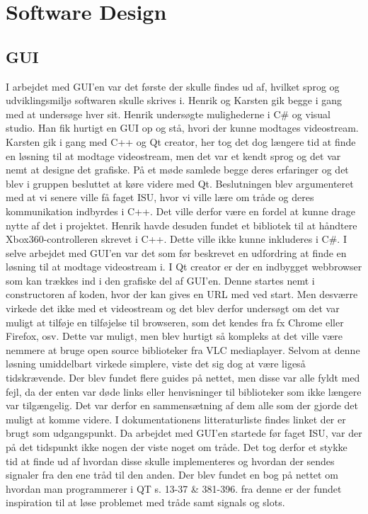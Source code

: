 \section{Software Design} \label{ch:SWdesign}


\subsection{GUI}
I arbejdet med GUI’en var det første der skulle findes ud af, hvilket sprog og udviklingsmiljø softwaren skulle skrives i. Henrik og Karsten gik begge i gang med at undersøge hver sit. Henrik undersøgte mulighederne i C\# og visual studio. Han fik hurtigt en GUI op og stå, hvori der kunne modtages videostream. Karsten gik i gang med C++ og Qt creator, her tog det dog længere tid at finde en løsning til at modtage videostream, men det var et kendt sprog og det var nemt at designe det grafiske. På et møde samlede begge deres erfaringer og det blev i gruppen besluttet at køre videre med Qt. Beslutningen blev argumenteret med at vi senere ville få faget ISU, hvor vi ville lære om tråde og deres kommunikation indbyrdes i C++. Det ville derfor være en fordel at kunne drage nytte af det i projektet. Henrik havde desuden fundet et bibliotek til at håndtere Xbox360-controlleren skrevet i C++. Dette ville ikke kunne inkluderes i C\#.
I selve arbejdet med GUI’en var det som før beskrevet en udfordring at finde en løsning til at modtage videostream i. I Qt creator er der en indbygget webbrowser som kan trækkes ind i den grafiske del af GUI’en. Denne startes nemt i constructoren af koden, hvor der kan gives en URL med ved start. Men desværre virkede det ikke med et videostream og det blev derfor undersøgt om det var muligt at tilføje en tilføjelse til browseren, som det kendes fra fx Chrome eller Firefox, osv. Dette var muligt, men blev hurtigt så kompleks at det ville være nemmere at bruge open source biblioteker fra VLC mediaplayer. Selvom at denne løsning umiddelbart virkede simplere, viste det sig dog at være ligeså tidskrævende. Der blev fundet flere guides på nettet, men disse var alle fyldt med fejl, da der enten var døde links eller henvisninger til biblioteker som ikke længere var tilgængelig. Det var derfor en sammensætning af dem alle som der gjorde det muligt at komme videre. I dokumentationens litteraturliste findes linket \cite{lib:vlc-using-qt} der er brugt som udgangspunkt. 
Da arbejdet med GUI’en startede før faget ISU, var der på det tidspunkt ikke nogen der viste noget om tråde. Det tog derfor et stykke tid at finde ud af hvordan disse skulle implementeres og hvordan der sendes signaler fra den ene tråd til den anden. Der blev fundet en bog på nettet om hvordan man programmerer i QT \cite{lib:qt-bog} s. 13-37 \& 381-396. fra denne er der fundet inspiration til at løse problemet med tråde samt signals og slots.  
